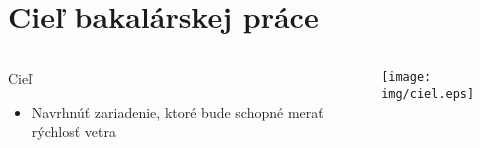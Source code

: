 \section{Cieľ bakalárskej práce}
\begin{snimka}
   \begin{columns}[c]
    \begin{column}{0.6\textwidth}
    \begin{block}{Cieľ}
    \begin{itemize}
         \item Navrhnúť zariadenie, ktoré bude schopné merať rýchlosť vetra
     \end{itemize}
  \end{block}
   \end{column}
    \begin{column}{0.45\textwidth}
      \begin{center}
        \texttt{[image: img/ciel.eps]}
      \end{center}
    \end{column}
  \end{columns}
\end{snimka}